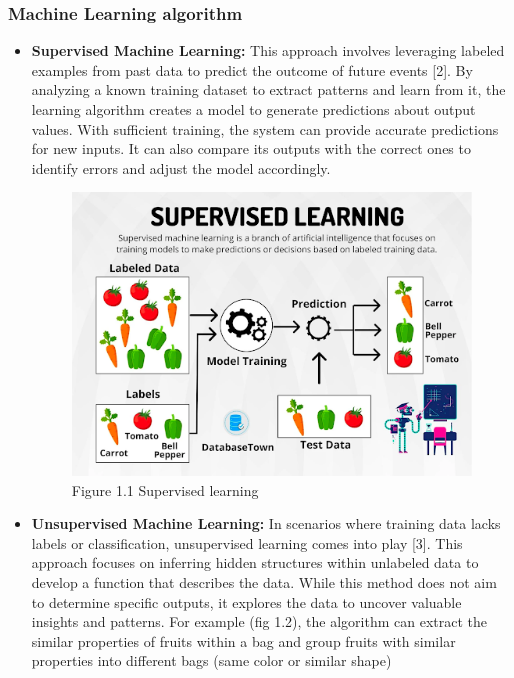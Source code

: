 \subsubsection{Machine Learning algorithm}
\begin{itemize}
\item\textbf{Supervised Machine Learning: }This approach involves leveraging labeled examples from past data to predict the outcome of future events [2]. By analyzing a known training dataset to extract patterns and learn from it, the learning algorithm creates a model to generate predictions about output values. With sufficient training, the system can provide accurate predictions for new inputs. It can also compare its outputs with the correct ones to identify errors and adjust the model accordingly.
\begin{center}
    \begin{figure}[!htp]
        \centering
        \includegraphics[width=0.8 \textwidth]{image/supervised_learning.png}
        \caption{Figure 1.1 Supervised learning}
        \label{subsection}
    \end{figure}
    \end{center}
\item\textbf{Unsupervised Machine Learning: } In scenarios where training data lacks labels or classification, unsupervised learning comes into play [3]. This approach focuses on inferring hidden structures within unlabeled data to develop a function that describes the data. While this method does not aim to determine specific outputs, it explores the data to uncover valuable insights and patterns.
\newline
For example (fig 1.2), the algorithm can extract the similar properties of fruits within a bag and group fruits with similar properties into different bags (same color or similar shape)


\end{itemize}
